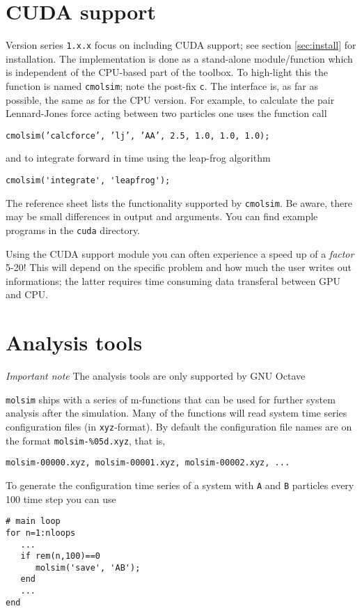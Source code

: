 \documentclass[11pt]{article}
\begin{document}
\section{CUDA support}
Version series \verb!1.x.x! focus on including CUDA support; see section \ref{sec:install} for installation. 
The implementation is done as a stand-alone module/function which is independent of the CPU-based part 
of the toolbox. To high-light this the function is named \verb!cmolsim!; note the post-fix \verb!c!. The interface 
is, as far as possible, the same as for the CPU version. For example, to calculate the pair Lennard-Jones 
force acting between two particles one uses the function call
\begin{verbatim}
cmolsim(’calcforce’, ’lj’, ’AA’, 2.5, 1.0, 1.0, 1.0);
\end{verbatim}
and to integrate forward in time using the leap-frog algorithm 
\begin{verbatim}
cmolsim('integrate', 'leapfrog');
\end{verbatim}
The reference sheet lists the functionality supported by \verb!cmolsim!. Be aware, there may be small differences in 
output and arguments. You can find example programs in the \verb!cuda! directory. 
\bigskip

\noindent Using the CUDA support module you can often experience a speed up of a \emph{factor} 5-20! This will depend
on the specific problem and how much the user writes out informations; the latter requires time consuming data 
transferal between GPU and CPU. 


\section{Analysis tools} 

\textit{Important note} The analysis tools are only supported by GNU Octave

\bigskip

\noindent \verb!molsim! ships with a series of m-functions that can be used for further system analysis after the 
simulation. Many of the functions will read system time series configuration files (in \verb!xyz!-format). 
By default the configuration file names are on the format \verb!molsim-%05d.xyz!, that is, 
\begin{verbatim}
molsim-00000.xyz, molsim-00001.xyz, molsim-00002.xyz, ...
\end{verbatim}
To generate the configuration time series of a system with \verb!A! and \verb!B! particles every 100 time step you can use 
\begin{verbatim}
# main loop
for n=1:nloops
   ...
   if rem(n,100)==0
      molsim('save', 'AB');
   end
   ...
end
\end{verbatim}
\end{document}
